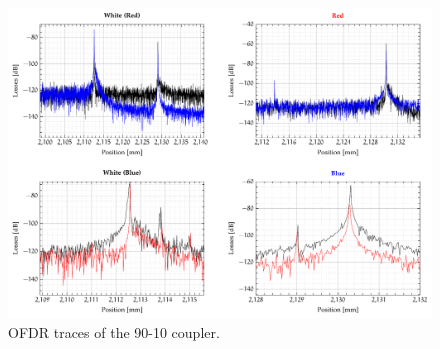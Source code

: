 \begin{figure}[hbt]
	\myfloatalign
	\includegraphics[width=\linewidth]{gfx/ch3/couplers/couplerC}
	\caption{OFDR traces of the 90-10 coupler.}\label{fig:couplerC}
\end{figure}
